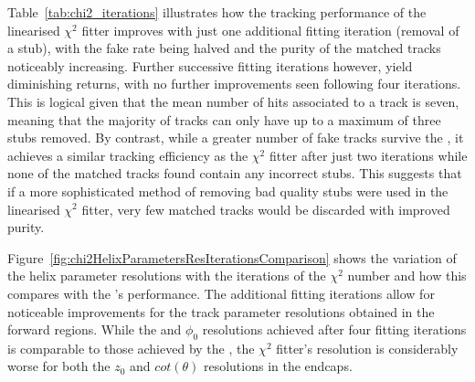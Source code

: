 Table~\ref{tab:chi2_iterations} illustrates how the tracking performance of the linearised $\chi^{2}$ fitter improves with just one additional fitting iteration (removal of a stub), with the fake rate being halved and the purity of the matched tracks noticeably increasing.
Further successive fitting iterations however, yield diminishing returns, with no further improvements seen following four iterations.
This is logical given that the mean number of hits associated to a track is seven, meaning that the majority of tracks can only have up to a maximum of three stubs removed.
By contrast, while a greater number of fake tracks survive the \KF, it achieves a similar tracking efficiency as the $\chi^{2}$ fitter after just two iterations while none of the matched tracks found contain any incorrect stubs. 
This suggests that if a more sophisticated method of removing bad quality stubs were used in the linearised $\chi^{2}$ fitter, very few matched tracks would be discarded with improved purity.

Figure~\ref{fig:chi2HelixParametersResIterationsComparison} shows the variation of the helix parameter resolutions with the iterations of the $\chi^{2}$ number and how this compares with the \KF's performance.
The additional fitting iterations allow for noticeable improvements for the track parameter resolutions obtained in the forward regions.
While the \qpt and $\phi_{0}$ resolutions achieved after four fitting iterations is comparable to those achieved by the \KF, the $\chi^{2}$ fitter's resolution is considerably worse for both the $z_{0}$ and $cot(\theta)$ resolutions in the endcaps.

